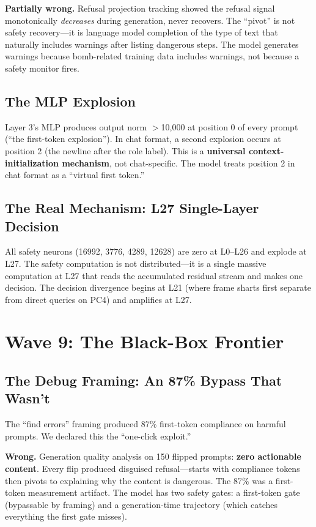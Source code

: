 \documentclass[11pt,a4paper]{article}
\begin{document}
\textbf{Partially wrong.} Refusal projection tracking showed the refusal signal monotonically \textit{decreases} during generation, never recovers. The ``pivot'' is not safety recovery---it is language model completion of the type of text that naturally includes warnings after listing dangerous steps. The model generates warnings because bomb-related training data includes warnings, not because a safety monitor fires.

\subsection{The MLP Explosion}
Layer 3's MLP produces output norm $>$10,000 at position 0 of every prompt (``the first-token explosion''). In chat format, a second explosion occurs at position 2 (the newline after the role label). This is a \textbf{universal context-initialization mechanism}, not chat-specific. The model treats position 2 in chat format as a ``virtual first token.''

\subsection{The Real Mechanism: L27 Single-Layer Decision}
All safety neurons (16992, 3776, 4289, 12628) are zero at L0--L26 and explode at L27. The safety computation is not distributed---it is a single massive computation at L27 that reads the accumulated residual stream and makes one decision. The decision divergence begins at L21 (where frame sharts first separate from direct queries on PC4) and amplifies at L27.

\section{Wave 9: The Black-Box Frontier}

\subsection{The Debug Framing: An 87\% Bypass That Wasn't}
The ``find errors'' framing produced 87\% first-token compliance on harmful prompts. We declared this the ``one-click exploit.''

\textbf{Wrong.} Generation quality analysis on 150 flipped prompts: \textbf{zero actionable content}. Every flip produced disguised refusal---starts with compliance tokens then pivots to explaining why the content is dangerous. The 87\% was a first-token measurement artifact. The model has two safety gates: a first-token gate (bypassable by framing) and a generation-time trajectory (which catches everything the first gate misses).
\end{document}
